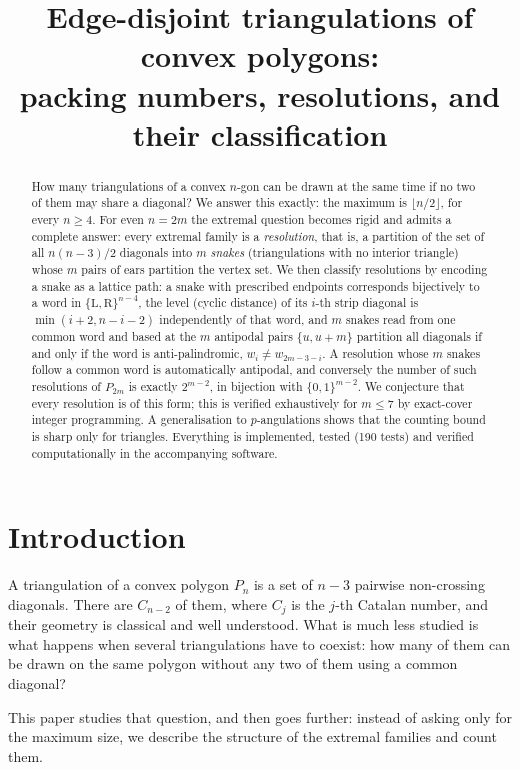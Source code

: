 \documentclass[11pt,a4paper]{article}
\title{\bfseries Edge-disjoint triangulations of convex polygons:\\
packing numbers, resolutions, and their classification}
\author{}
\date{}
\theoremstyle{definition}
\theoremstyle{remark}
\newcommand{\Li}{\mathrm{L}}
\newcommand{\Ri}{\mathrm{R}}
\begin{document}
\maketitle

\begin{abstract}
How many triangulations of a convex $n$-gon can be drawn at the same time if no two of
them may share a diagonal?  We answer this exactly: the maximum is $\lfloor n/2\rfloor$,
for every $n\ge 4$.  For even $n=2m$ the extremal question becomes rigid and admits a
complete answer: every extremal family is a \emph{resolution}, that is, a partition of the
set of all $n(n-3)/2$ diagonals into $m$ \emph{snakes} (triangulations with no interior
triangle) whose $m$ pairs of ears partition the vertex set.  We then classify resolutions
by encoding a snake as a lattice path: a snake with prescribed endpoints corresponds
bijectively to a word in $\{\Li,\Ri\}^{n-4}$, the level (cyclic distance) of its
$i$-th strip diagonal is $\min(i+2,n-i-2)$ independently of that word, and $m$ snakes read
from one common word and based at the $m$ antipodal pairs $\{u,u+m\}$ partition all
diagonals if and only if the word is anti-palindromic, $w_i\ne w_{2m-3-i}$.  A resolution
whose $m$ snakes follow a common word is automatically antipodal, and conversely the number
of such resolutions of $P_{2m}$ is exactly $2^{m-2}$, in bijection with $\{0,1\}^{m-2}$.  We
conjecture that every resolution is of this form; this is verified exhaustively for
$m\le 7$ by exact-cover integer programming.  A generalisation to
$p$-angulations shows that the counting bound is sharp only for triangles.  Everything is
implemented, tested (190 tests) and verified computationally in the accompanying software.
\end{abstract}

\section{Introduction}

A triangulation of a convex polygon $P_n$ is a set of $n-3$ pairwise non-crossing
diagonals.  There are $C_{n-2}$ of them, where $C_j$ is the $j$-th Catalan number, and
their geometry is classical and well understood.  What is much less studied is what happens
when several triangulations have to coexist: how many of them can be drawn on the same
polygon without any two of them using a common diagonal?

This paper studies that question, and then goes further: instead of asking only for the
maximum size, we describe the structure of the extremal families and count them.
\end{document}
